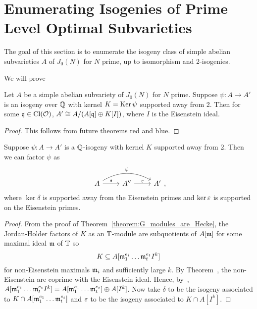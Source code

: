 \documentclass{article}
\begin{document}
\section{Enumerating Isogenies of Prime Level Optimal Subvarieties}

The goal of this section is to enumerate the isogeny class of simple abelian
subvarieties $A$ of $J_0(N)$ for $N$ prime, up to isomorphism and 2-isogenies.

We will prove
\begin{theorem}
    Let $A$ be a simple abelian subvariety of $J_0(N)$ for $N$ prime. Suppose
    $\psi: A\to A'$ is an isogeny over $\mathbb{Q}$ with kernel $K = \operatorname{Ker} \psi$
    supported away from 2. Then for some $\mathfrak{q} \in \operatorname{Cl}(\mathcal{O})$, $A'\cong
    A/(A[\mathfrak{q}]\oplus K[I])$, where $I$ is the Eisenstein ideal.
\end{theorem}
\begin{proof}
    This follows from future theorems red and blue.
\end{proof}

\begin{lemma}\label{lemma:factor_isogeny}
    Suppose $\psi:A \to A'$ is a $\mathbb{Q}$-isogeny with kernel $K$ supported away from
    2. Then we can factor $\psi$ as 
    \[
        \begin{tikzcd}
            A 
            \arrow[r, "\delta"] 
            \arrow[rr, bend left=30, "\psi"] 
            &
            A'' 
            \arrow[r, "\eps"]
            &
            A'
        \end{tikzcd},
    \]
    where $\ker\delta$ is supported away from the Eisenstein primes and
    $\ker\varepsilon$ is supported on the Eisenstein primes.
\end{lemma}
\begin{proof}
    From the proof of Theorem~\ref{theorem:G_modules_are_Hecke}, the
    Jordan-Holder factors of $K$ as an $\mathbb{T}$-module are subquotients of $A[\mathfrak{m}]$
    for some maximal ideal $\mathfrak{m}$ of $\mathbb{T}$ so
    \[  
        K \subseteq 
        A[\mathfrak{m}_1 ^{e_i}\ldots \mathfrak{m}_t ^{e_t} I^k]
    \]
    for non-Eisenstein maximals $\mathfrak{m}_i$ and sufficiently large $k$. By
    Theorem~\cite[5.2(c)]{ribet:modreps}, the non-Eisenstein are coprime with
    the Eisenstein ideal. Hence, by~\cite[\S II, Prop 18]{MR1492449}, $A[\mathfrak{m}_1
    ^{e_1}\ldots \mathfrak{m}_t ^{e_t} I^k] = A[\mathfrak{m}_1 ^{e_1}\ldots \mathfrak{m}_t ^{e_t}] \oplus
    A[I^k]$. Now take $\delta$ to be the isogeny associated to $K \cap A[\mathfrak{m}_1
    ^{e_1} \ldots \mathfrak{m}_t ^{e_t}]$ and $\varepsilon$ to be the isogeny associated to
    $K\cap A[I^k]$.
\end{proof}
\end{document}
